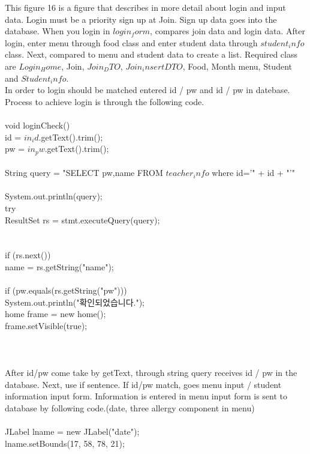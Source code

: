 \documentclass[a4paper,11pt]{IEEEtran}
\begin{document}
{This figure 16 is a figure that describes in more detail about login and input data. Login must be a priority sign up at Join. Sign up data goes into the database. When you login in $login_form$, compares join data and login data. After login, enter menu through food class and enter student data through $student_info$ class. Next, compared to menu and student data to create a list. Required class are $Login_Home$, Join, $Join_DTO$, $Join_insertDTO$, Food, Month menu, Student and $Student_info$.\\
In order to login should be matched entered id / pw and id / pw in datebase. Process to achieve login is through the following code.
~\\
\\
void loginCheck() {\\
id = $in_id$.getText().trim();\\
pw = $in_pw$.getText().trim();\\
~\\
String query = "SELECT pw,name FROM $teacher_info$ where id='" + id + "'"\\
~\\
System.out.println(query);\\
try{\\
ResultSet rs = stmt.executeQuery(query);\\
\\\\
if (rs.next()) {\\
name = rs.getString("name");\\
~\\
if (pw.equals(rs.getString("pw"))) {
~\\
   System.out.println("확인되었습니다.");\\
   home frame = new home();\\
   frame.setVisible(true);\\
}\\\\
~\\
After id/pw come take by getText, through string query receives id / pw in the database. Next, use if sentence. If id/pw match, goes menu input / student information input form. Information is entered in menu input form is sent to database by following code.(date, three allergy component in menu)
~\\~\\
JLabel lname = new JLabel("date");\\
lname.setBounds(17, 58, 78, 21);\\
}}}}
\end{document}
